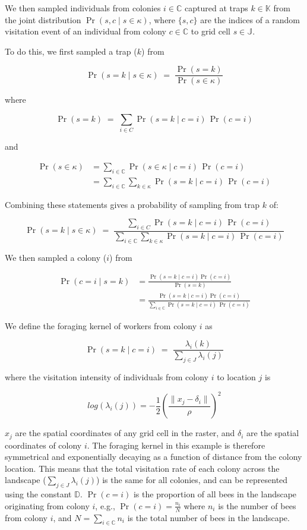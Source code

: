\documentclass[11pt]{article}
\begin{document}
We then sampled individuals from colonies $i \in \mathbb{C}$ captured at traps $k \in \mathbb{K}$ from the joint distribution $\Pr(s, c \mid s \in \kappa)$, where $\{s,c\}$ are the indices of a random visitation event of an individual from colony $c \in \mathbb{C}$ to grid cell $s \in \mathbb{J}$.

To do this, we first sampled a trap ($k$) from

\[
\Pr(s = k \mid s \in \kappa) \;=\; \frac{\Pr(s = k)}{\Pr(s \in \kappa)} \tag{1}
\]

where

\[
\Pr(s = k) \;=\; \sum_{i \in C} \Pr(s = k \mid c = i)\,\Pr(c = i)
\]

and

\begin{align*}
\Pr(s \in \kappa) 
    &= \sum_{i \in \mathbb{C}} \Pr(s \in \kappa \mid c = i)\,\Pr(c = i) \\[0.5em]
    &= \sum_{i \in \mathbb{C}} \sum_{k \in \kappa} \Pr(s = k \mid c = i)\,\Pr(c = i)
\end{align*}


Combining these statements gives a probability of sampling from trap $k$ of:

\[
\Pr(s = k \mid s \in \kappa) \;=\; \frac{\sum_{i \in C} \Pr(s = k \mid c = i)\,\Pr(c = i)}{\sum_{i \in \mathbb{C}} \sum_{k \in \kappa} \Pr(s = k \mid c = i)\,\Pr(c = i)} \tag{2}
\]

We then sampled a colony ($i$) from

\begin{align*}
\Pr(c = i \mid s = k)
  &= \frac{\Pr(s = k \mid c = i) \Pr(c = i)}{\Pr(s = k)} \\[0.5em]
  &= \frac{\Pr(s = k \mid c = i) \Pr(c = i)}{\sum_{i \in \mathbb{C}} \Pr(s = k \mid c = i)\,\Pr(c = i)} \tag{3}
\end{align*}


We define the foraging kernel of workers from colony $i$ as

\[
\Pr(s = k \mid c = i)
\;=\; 
\frac{\lambda_i(k)}{\sum_{j \in J} \lambda_i(j)} \tag{4}
\]

where the visitation intensity of individuals from colony $i$ to location $j$ is 

\[
log(\lambda_i(j)) = -\frac{1}{2}\left(\frac{\lVert x_j - \delta_i \rVert}{\rho}\right)^2 \tag{5}
\]


$x_j$ are the spatial coordinates of any grid cell in the raster, and $\delta_i$ are the spatial coordinates of colony $i$. The foraging kernel in this example is therefore symmetrical and exponentially decaying as a function of distance from the colony location. This means that the total visitation rate of each colony across the landscape ($\sum_{j \in J} \lambda_i(j)$) is the same for all colonies, and can be represented using the constant $\mathbb{D}$. $\Pr(c = i)$ is the proportion of all bees in the landscape originating from colony $i$, e.g., $\Pr(c = i) = \frac{n_i}{N}$ where $n_i$ is the number of bees from colony $i$, and $N = \sum_{i \in \mathbb{C}} n_i$ is the total number of bees in the landscape.
\end{document}
